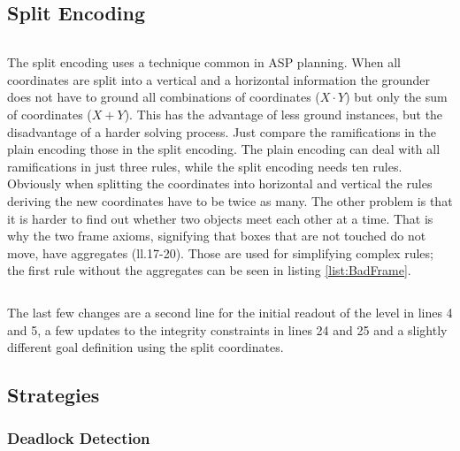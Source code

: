 \documentclass[12pt,a4paper,oneside]{report}
\begin{document}
\subsection{Split Encoding}

\begin{lstlisting}[caption={Split Encoding},label=list:SplitEnc]
\end{lstlisting}
The split encoding uses a technique common in ASP planning. When all coordinates are split into a vertical and a horizontal information the grounder does not have to ground all combinations of coordinates ($X \cdot Y$) but only the sum of coordinates ($X + Y$). This has the advantage of less ground instances, but the disadvantage of a harder solving process. Just compare the ramifications in the plain encoding those in the split encoding. The plain encoding can deal with all ramifications in just three rules, while the split encoding needs ten rules. Obviously when splitting the coordinates into horizontal and vertical the rules deriving the new coordinates have to be twice as many. The other problem is that it is harder to find out whether two objects meet each other at a time. That is why the two frame axioms, signifying that boxes that are not touched do not move, have aggregates (ll.17-20). Those are used for simplifying complex rules; the first rule without the aggregates can be seen in listing \ref{list:BadFrame}.

\begin{lstlisting}[caption={Frame Axiom X},label=list:BadFrame]
\end{lstlisting}
The last few changes are a second line for the initial readout of the level in lines 4 and 5, a few updates to the integrity constraints in lines 24 and 25 and a slightly different goal definition using the split coordinates.

\subsection{Strategies}

\subsubsection{Deadlock Detection}
\end{document}
